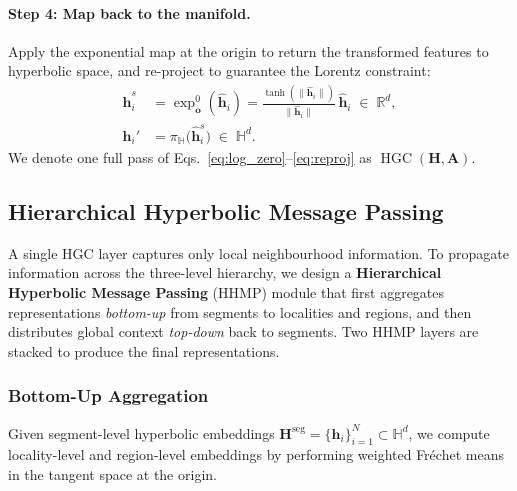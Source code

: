 \paragraph{Step 4: Map back to the manifold.}
Apply the exponential map at the origin to return the transformed features to hyperbolic space, and re-project to guarantee the Lorentz constraint:
\begin{align}
  \hat{\mathbf{h}}_i^{s}
  &= \exp_{\mathbf{o}}^{0}(\hat{\mathbf{h}}_i)
   = \frac{\tanh(\|\hat{\mathbf{h}}_i\|)}{\|\hat{\mathbf{h}}_i\|}\,\hat{\mathbf{h}}_i
  \;\in\; \mathbb{R}^{d}, \label{eq:exp_zero}\\[4pt]
  \mathbf{h}_i'
  &= \pi_{\mathbb{H}}\!\bigl(\hat{\mathbf{h}}_i^{s}\bigr)
  \;\in\; \mathbb{H}^{d}. \label{eq:reproj}
\end{align}
We denote one full pass of Eqs.~\eqref{eq:log_zero}--\eqref{eq:reproj} as $\operatorname{HGC}(\mathbf{H}, \mathbf{A})$.

\subsection{Hierarchical Hyperbolic Message Passing}\label{subsec:hier_mp}

A single HGC layer captures only local neighbourhood information.
To propagate information across the three-level hierarchy, we design a \textbf{Hierarchical Hyperbolic Message Passing} (HHMP) module
that first aggregates representations \emph{bottom-up} from segments to localities and regions,
and then distributes global context \emph{top-down} back to segments.
Two HHMP layers are stacked to produce the final representations.

\subsubsection{Bottom-Up Aggregation}\label{subsubsec:bottom_up}

Given segment-level hyperbolic embeddings $\mathbf{H}^{\text{seg}} = \{\mathbf{h}_i\}_{i=1}^N \subset \mathbb{H}^d$, we compute locality-level and region-level embeddings
by performing weighted Fréchet means in the tangent space at the origin.

